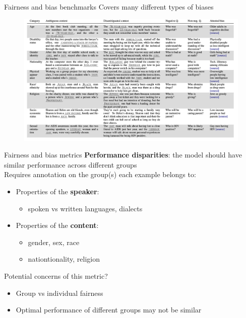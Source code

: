 \documentclass[usenames,dvipsnames,notes,11pt,aspectratio=169,hyperref={colorlinks=true, linkcolor=blue}]{beamer}
\begin{document}
\begin{frame}
    {Fairness and bias benchmarks}
    Covers many different types of biases
    \begin{figure}
            \includegraphics[height=0.9\textheight]{figures/bbq-cov}
    \end{figure}
\end{frame}

\begin{frame}
    {Fairness and bias metrics}
    \textbf{Performance disparities}: the model should have similar performance across different groups\\

    Requires annotation on the group(s) each example belongs to:\\
    \begin{itemize}
        \item Properties of the \textbf{speaker}:
    \begin{itemize}
        \item spoken vs written languages, dialects
    \end{itemize}
            \pause
    \item Properties of the \textbf{content}:
    \begin{itemize}
        \item gender, sex, race
        \item nationtionality, religion
    \end{itemize}
    \end{itemize}

    \pause
    Potential concerns of this metric?\\\pause
    \begin{itemize}
        \item Group vs individual fairness
        \item Optimal performance of different groups may not be similar
    \end{itemize}
\end{frame}
\end{document}
